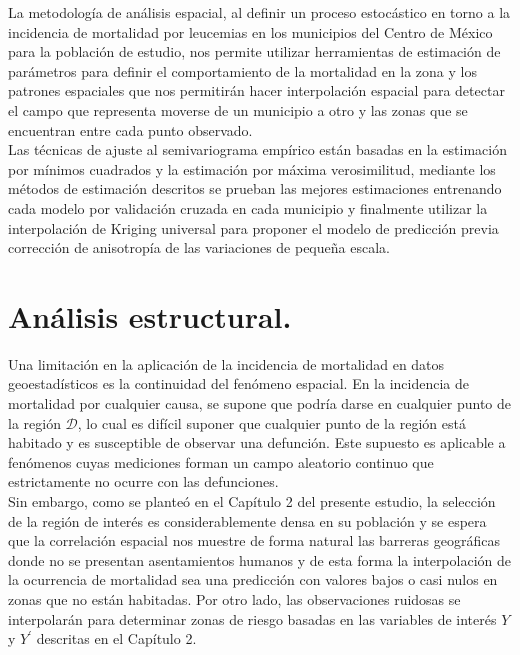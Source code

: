 \documentclass[11pt, oneside]{book}
\begin{document}
La metodología de análisis espacial, al definir un proceso estocástico en torno a la incidencia de mortalidad por leucemias en los municipios del Centro de México para la población de estudio, nos permite utilizar herramientas de estimación de parámetros para definir el comportamiento de la mortalidad en la zona y los patrones espaciales que nos permitirán hacer interpolación espacial para detectar el campo que representa moverse de un municipio a otro y las zonas que se encuentran entre cada punto observado.\\

Las técnicas de ajuste al semivariograma empírico están basadas en la estimación por mínimos cuadrados y la estimación por máxima verosimilitud, mediante los métodos de estimación descritos se prueban las mejores estimaciones entrenando cada modelo por validación cruzada en cada municipio y finalmente utilizar la interpolación de Kriging universal para proponer el modelo de predicción previa corrección de anisotropía de las variaciones de pequeña escala.

\section{Análisis estructural.}

Una limitación en la aplicación de la incidencia de mortalidad en datos geoestadísticos es la continuidad del fenómeno espacial. En la incidencia de mortalidad por cualquier causa, se supone que podría darse en cualquier punto de la región $\mathcal{D}$, lo cual es difícil suponer que cualquier punto de la región está habitado y es susceptible de observar una defunción. Este supuesto es aplicable a fenómenos cuyas mediciones forman un campo aleatorio continuo que estrictamente no ocurre con las defunciones.\\ 

Sin embargo, como se planteó en el Capítulo 2 del presente estudio, la selección de la región de interés es considerablemente densa en su población y se espera que la correlación espacial nos muestre de forma natural las barreras geográficas donde no se presentan asentamientos humanos y de esta forma la interpolación de la ocurrencia de mortalidad sea una predicción con valores bajos o casi nulos en zonas que no están habitadas. Por otro lado, las observaciones ruidosas se interpolarán para determinar zonas de riesgo basadas en las variables de interés $Y$ y $Y^{'}$ descritas en el Capítulo 2.\\
\end{document}
